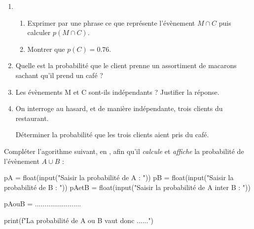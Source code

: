 \documentclass[a4paper,11pt]{article}
\begin{document}
\begin{enumerate}
\begin{center}
	\end{center}
	\item  
	\begin{enumerate}
		\item Exprimer par une phrase ce que représente l'évènement $M \cap C$ puis calculer $p(M \cap C)$. 
		\item Montrer que $p(C) = \num{0,76}$.
	\end{enumerate} 
	\item Quelle est la probabilité que le client prenne un assortiment de macarons sachant qu'il prend un café ?
	\item Les évènements M et C sont-ils indépendants ? Justifier la réponse.
	\item On interroge au hasard, et de manière indépendante, trois clients du restaurant.
	
	Déterminer la probabilité que les trois clients aient pris du café.
\end{enumerate}

\medskip


\medskip

Compléter l'agorithme suivant, en \calgpython, afin qu'il \textit{calcule} et \textit{affiche} la probabilité de l'évènement $A \cup B$ :

\begin{envpython}[14cm]
pA = float(input("Saisir la probabilité de A : "))
pB = float(input("Saisir la probabilité de B : "))
pAetB = float(input("Saisir la probabilité de A inter B : "))

pAouB = ........................

print(f"La probabilité de A ou B vaut donc {......}")
\end{envpython}

\newpage

\end{document}
